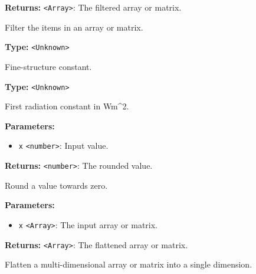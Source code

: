 \documentclass[12pt,a4paper]{article}
\begin{document}
\noindent \textbf{Returns:} \texttt{<Array>}: The filtered array or matrix.

\noindent Filter the items in an array or matrix.

\vspace{5mm}
\noindent {}\vspace{4mm}


\noindent \textbf{Type:} \texttt{<Unknown>}

\noindent Fine-structure constant.

\vspace{5mm}
\noindent {}\vspace{4mm}


\noindent \textbf{Type:} \texttt{<Unknown>}

\noindent First radiation constant in Wm\textasciicircum{}2.

\vspace{5mm}
\noindent {}


\noindent \textbf{Parameters:}
\begin{itemize}
  \item \texttt{x} \texttt{<number>}: Input value.
\end{itemize}

\noindent \textbf{Returns:} \texttt{<number>}: The rounded value.

\noindent Round a value towards zero.

\vspace{5mm}
\noindent {}


\noindent \textbf{Parameters:}
\begin{itemize}
  \item \texttt{x} \texttt{<Array>}: The input array or matrix.
\end{itemize}

\noindent \textbf{Returns:} \texttt{<Array>}: The flattened array or matrix.

\noindent Flatten a multi-dimensional array or matrix into a single dimension.

\vspace{5mm}
\noindent {}
\end{document}
